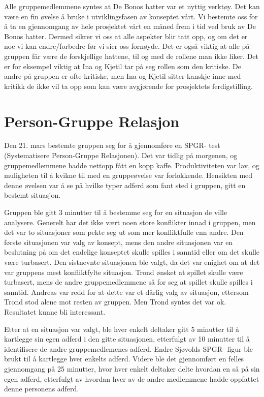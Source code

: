 Alle gruppemedlemmene syntes at De Bonos hatter var et nyttig verktøy. Det kan være en fin øvelse å bruke i utviklingsfasen av konseptet vårt. Vi bestemte oss for å ta en gjennomgang av hele prosjektet vårt en måned frem i tid ved bruk av De Bonos hatter. Dermed sikrer vi oss at alle aspekter blir tatt opp, og om det er noe vi kan endre/forbedre før vi sier oss fornøyde. Det er også viktig at alle på gruppen får være de forskjellige hattene, til og med de rollene man ikke liker. Det er for eksempel viktig at Ina og Kjetil tar på seg rollen som den kritiske. De andre på gruppen er ofte kritiske, men Ina og Kjetil sitter kanskje inne med kritikk de ikke vil ta opp som kan være avgjørende for prosjektets ferdigstilling. 


\section{Person-Gruppe Relasjon} %
Den 21. mars bestemte gruppen seg for å gjennomføre en SPGR- test (Systematisere Person-Gruppe Relasjonen). Det var tidlig på morgenen, og gruppemedlemmene hadde nettopp fått en kopp kaffe. Produktiviteten var lav, og muligheten til å kvikne til med en gruppeøvelse var forlokkende. Hensikten med denne øvelsen var å se på hvilke typer adferd som fant sted i gruppen, gitt en bestemt situasjon. 

Gruppen ble gitt 3 minutter til å bestemme seg for en situasjon de ville analysere. Generelt har det ikke vært noen store konflikter innad i gruppen, men det var to situasjoner som pekte seg ut som mer konfliktfulle enn andre. Den første situasjonen var valg av konsept, mens den andre situasjonen var en beslutning på om det endelige konseptet skulle spilles i sanntid eller om det skulle være turbasert. Den sistnevnte situasjonen ble valgt, da det var enighet om at det var gruppens mest konfliktfylte situasjon. Trond ønsket at spillet skulle være turbasert, mens de andre gruppemedlemmene så for seg at spillet skulle spilles i sanntid. Andreas var redd for at dette var et dårlig valg av situasjon, ettersom Trond stod alene mot resten av gruppen. Men Trond syntes det var ok. Resultatet kunne bli interessant.

Etter at en situasjon var valgt, ble hver enkelt deltaker gitt 5 minutter til å kartlegge sin egen adferd i den gitte situasjonen, etterfulgt av 10 minutter til å identifisere de andre gruppemedlemenes adferd. Endre Sjøvolds SPGR- figur ble brukt til å kartlegge hver enkelts adferd. Videre ble det gjennomført en felles gjennomgang på 25 minutter, hvor hver enkelt deltaker delte hvordan en så på sin egen adferd, etterfulgt av hvordan hver av de andre medlemmene hadde oppfattet denne personens adferd. 

